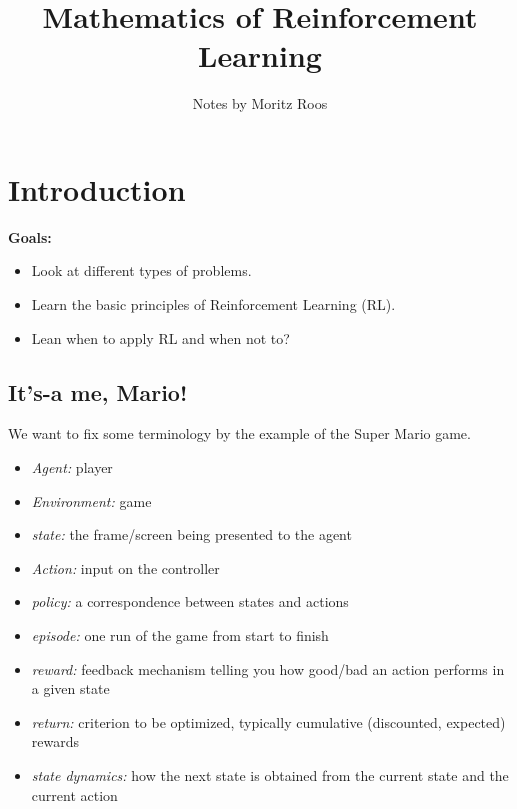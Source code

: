 







\title{Mathematics of Reinforcement Learning}

\author{Notes by Moritz Roos}
\date{}

\maketitle

\tableofcontents
%

\clearpage
\section{Introduction}
\textbf{Goals:}
\begin{itemize}
    \item Look at different types of problems.
    \item Learn the basic principles of Reinforcement Learning (RL).
    \item Lean when to apply RL and when not to?
\end{itemize}

\subsection{It's-a me, Mario!}
We want to fix some terminology by the example of the Super Mario game.
\begin{itemize}
    \item \emph{Agent:} player
    \item \emph{Environment:} game
    \item \emph{state:} the frame/screen being presented to the agent
    \item \emph{Action:} input on the controller
    \item \emph{policy:} a correspondence between states and actions
    \item \emph{episode:} one run of the game from start to finish
    \item \emph{reward:} feedback mechanism telling you how good/bad an action performs in a given state
    \item \emph{return:} criterion to be optimized, typically cumulative (discounted, expected) rewards
    \item \emph{state dynamics:} how the next state is obtained from the current state and the current action
\end{itemize}


